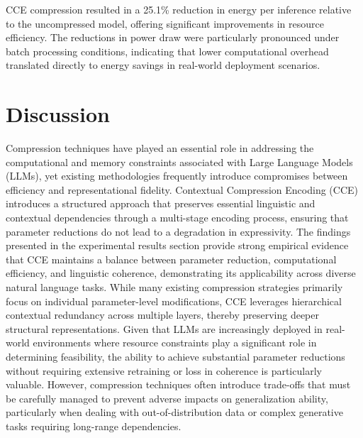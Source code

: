 \documentclass{article}
\begin{document}
CCE compression resulted in a 25.1\% reduction in energy per inference relative to the uncompressed model, offering significant improvements in resource efficiency. The reductions in power draw were particularly pronounced under batch processing conditions, indicating that lower computational overhead translated directly to energy savings in real-world deployment scenarios.



\section{Discussion}

Compression techniques have played an essential role in addressing the computational and memory constraints associated with Large Language Models (LLMs), yet existing methodologies frequently introduce compromises between efficiency and representational fidelity. Contextual Compression Encoding (CCE) introduces a structured approach that preserves essential linguistic and contextual dependencies through a multi-stage encoding process, ensuring that parameter reductions do not lead to a degradation in expressivity. The findings presented in the experimental results section provide strong empirical evidence that CCE maintains a balance between parameter reduction, computational efficiency, and linguistic coherence, demonstrating its applicability across diverse natural language tasks. While many existing compression strategies primarily focus on individual parameter-level modifications, CCE leverages hierarchical contextual redundancy across multiple layers, thereby preserving deeper structural representations. Given that LLMs are increasingly deployed in real-world environments where resource constraints play a significant role in determining feasibility, the ability to achieve substantial parameter reductions without requiring extensive retraining or loss in coherence is particularly valuable. However, compression techniques often introduce trade-offs that must be carefully managed to prevent adverse impacts on generalization ability, particularly when dealing with out-of-distribution data or complex generative tasks requiring long-range dependencies.
\end{document}
